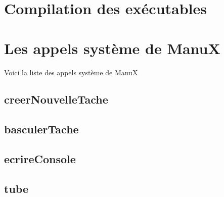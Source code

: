 %
\section{Compilation des exécutables}


%
\section{Les appels système de ManuX}

   Voici la liste des appels système de ManuX

%
\subsection{creerNouvelleTache}

%
\subsection{basculerTache}

%
\subsection{ecrireConsole}

%
\subsection{tube}


